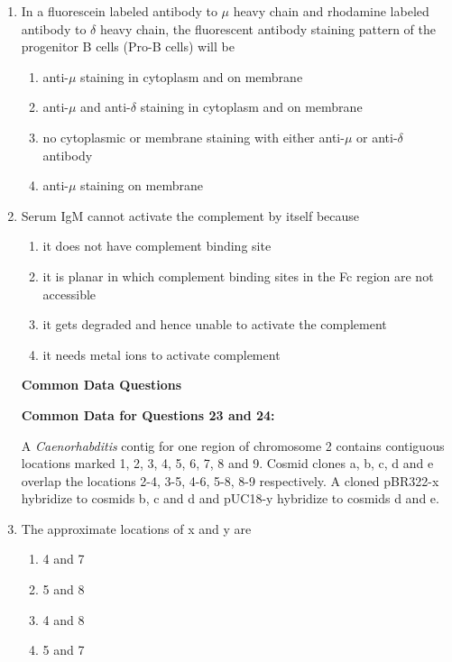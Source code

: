 \documentclass[journal,12pt,onecolumn]{IEEEtran}
\begin{document}
\begin{enumerate}
\item In a fluorescein labeled antibody to $\mu$ heavy chain and rhodamine labeled antibody to $\delta$ heavy chain, the fluorescent antibody staining pattern of the progenitor B cells (Pro-B cells) will be
\begin{multicols}{2}
\begin{enumerate}[label=(\Alph*)]
\item anti-$\mu$ staining in cytoplasm and on membrane
\item anti-$\mu$ and anti-$\delta$ staining in cytoplasm and on membrane
\item no cytoplasmic or membrane staining with either anti-$\mu$ or anti-$\delta$ antibody
\item anti-$\mu$ staining on membrane
\end{enumerate}
\end{multicols}
\item Serum IgM cannot activate the complement by itself because
\begin{multicols}{2}
\begin{enumerate}[label=(\Alph*)]
\item it does not have complement binding site
\item it is planar in which complement binding sites in the Fc region are not accessible
\item it gets degraded and hence unable to activate the complement
\item it needs metal ions to activate complement
\end{enumerate}
\end{multicols}
\noindent\textbf{Common Data Questions}

\noindent \textbf{Common Data for Questions 23 and 24:} 

A \textit{Caenorhabditis} contig for one region of chromosome 2 contains contiguous locations marked 1, 2, 3, 4, 5, 6, 7, 8 and 9. Cosmid clones a, b, c, d and e overlap the locations 2-4, 3-5, 4-6, 5-8, 8-9 respectively. A cloned pBR322-x hybridize to cosmids b, c and d and pUC18-y hybridize to cosmids d and e.

\item The approximate locations of x and y are
\begin{multicols}{2}
\begin{enumerate}[label=(\Alph*)]
\item 4 and 7
\item 5 and 8
\item 4 and 8
\item 5 and 7
\end{enumerate}
\end{multicols}


\end{enumerate}
\end{document}
